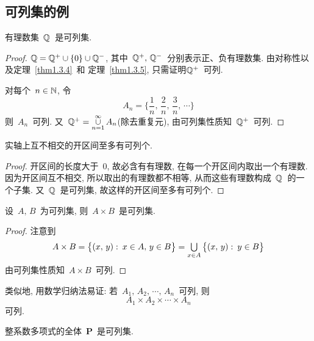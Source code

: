 \subsection{可列集的例}

\begin{example} \label{ex1.3.1}
有理数集~$\mathbb{Q}$~是可列集.
\end{example}

\begin{proof}
$\mathbb{Q} = \mathbb{Q}^+ \cup \{0\} \cup \mathbb{Q}^-$, 其中~$\mathbb{Q}^+, \, \mathbb{Q}^-$~分别表示正、负有理数集. 由对称性以及定理~\ref{thm1.3.4}~和
定理~\ref{thm1.3.5}, 只需证明$\mathbb{Q}^+$~可列.

对每个~$n \in \mathbb{N}$, 令
\[
A_n = \Big\{\frac{1}{n},\,\frac{2}{n},\,\frac{3}{n},\,\cdots\Big\}
\]
则~$A_n$~可列. 又~$\mathbb{Q}^+ = \mathop{\cup} \limits_{n=1} ^\infty A_n$(除去重复元), 由可列集性质知~$\mathbb{Q}^+$~可列.
\end{proof}

\medskip

\begin{example} \label{ex1.3.2}
实轴上互不相交的开区间至多有可列个.
\end{example}

\begin{proof}
开区间的长度大于~$0$, 故必含有有理数, 在每一个开区间内取出一个有理数. 因为开区间互不相交,
所以取出的有理数都不相等, 从而这些有理数构成~$\mathbb{Q}$~的一个子集. 又~$\mathbb{Q}$~是可列集,
故这样的开区间至多有可列个.
\end{proof}

\medskip

\begin{example} \label{ex1.3.3}
设~$A, \, B$~为可列集, 则~$A \times B$~是可列集.
\end{example}

\begin{proof}
注意到
\[
A \times B = \big\{(x,\,y): \: x \in A, \, y \in B\big\} = \mathop{\textstyle{\bigcup}}_{x \in A} \big\{(x,\,y): \: y \in B\big\}
\]
由可列集性质知~$A \times B$~可列.
\end{proof}

\begin{remark} \label{rem1.3.2}
类似地, 用数学归纳法易证: 若~$A_1,\, A_2,\, \cdots,\, A_n$~可列, 则
\[
A_1 \times A_2 \times \cdots \times A_n
\]
可列.
\end{remark}

\medskip

\begin{example} \label{ex1.3.4}
整系数多项式的全体~$\mathbf{P}$~是可列集.
\end{example}

